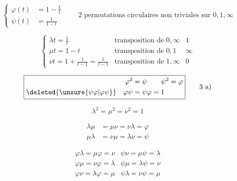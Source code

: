 \begingroup\makeatletter\tagsleft@true\makeatother
\[
\left\{\begin{aligned}
\varphi(t)&=1-\frac1t\\
\psi(t)&=\frac1{1-t}
\end{aligned}\right.\qquad
\text{2 permutations circulaires non triviales sur }0,1,\infty
\tag*{(1)}
\]
\endgroup

\begingroup\makeatletter\tagsleft@true\makeatother
\[
\left\{\begin{array}{ll||l}
\lambda t=\frac1t&\text{transposition de }0,\infty&1\\
\mu t=1-t&\text{transposition de }0,1&\infty\\
\nu t=1+\frac1{t-1}=\frac{t}{t-1}&\text{transposition de }1,\infty&0
\end{array}\right.
\tag*{(2)}
\]
\endgroup

\begingroup\makeatletter\tagsleft@true\makeatother
\[
\boxed{\begin{aligned}\varphi^2&=\psi\qquad\psi^2=\varphi\\
\deleted{\unsure{\psi\varphi|\varphi\psi}}\quad\varphi\psi&=\psi\varphi=1\end{aligned}}
\tag*{3 a)}
\]
\endgroup

\begingroup\makeatletter\tagsleft@true\makeatother
\[
\boxed{\lambda^2=\mu^2=\nu^2=1}\tag*{b)}
\]
\endgroup

\begingroup\makeatletter\tagsleft@true\makeatother
\[
\boxed{\begin{aligned}\lambda\mu&=\mu\nu=\nu\lambda=\varphi\\
\mu\lambda&=\nu\mu=\lambda\nu=\psi\end{aligned}}\tag*{c)}
\]
\endgroup

\begingroup\makeatletter\tagsleft@true\makeatother
\[
\boxed{\begin{array}{l|l}
\varphi\lambda=\mu\varphi=\nu&\psi\nu=\mu\psi=\lambda\\
\varphi\mu=\nu\varphi=\lambda&\psi\mu=\lambda\psi=\nu\\
\varphi\nu=\lambda\varphi=\mu&\psi\lambda=\nu\psi=\mu
\end{array}}\tag*{d)}
\]
\endgroup

